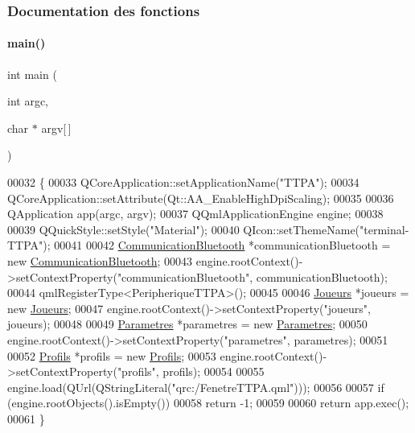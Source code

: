 \subsubsection{Documentation des fonctions}
\mbox{\label{terminal-_t_t_p_a_2main_8cpp_a0ddf1224851353fc92bfbff6f499fa97}} 
\paragraph{\texorpdfstring{main()}{main()}}
{\footnotesize\ttfamily int main (\begin{DoxyParamCaption}\item[{int}]{argc,  }\item[{char $\ast$}]{argv\mbox{[}$\,$\mbox{]} }\end{DoxyParamCaption})}


\begin{DoxyCode}
00032 \{
00033     QCoreApplication::setApplicationName(\textcolor{stringliteral}{"TTPA"});
00034     QCoreApplication::setAttribute(Qt::AA\_EnableHighDpiScaling);
00035 
00036     QApplication app(argc, argv);
00037     QQmlApplicationEngine engine;
00038 
00039     QQuickStyle::setStyle(\textcolor{stringliteral}{"Material"});
00040     QIcon::setThemeName(\textcolor{stringliteral}{"terminal-TTPA"});
00041 
00042     \hyperlink{class_communication_bluetooth}{CommunicationBluetooth} *communicationBluetooth = \textcolor{keyword}{new} 
      \hyperlink{class_communication_bluetooth}{CommunicationBluetooth};
00043     engine.rootContext()->setContextProperty(\textcolor{stringliteral}{"communicationBluetooth"}, communicationBluetooth);
00044     qmlRegisterType<PeripheriqueTTPA>();
00045 
00046     \hyperlink{class_joueurs}{Joueurs} *joueurs = \textcolor{keyword}{new} \hyperlink{class_joueurs}{Joueurs};
00047     engine.rootContext()->setContextProperty(\textcolor{stringliteral}{"joueurs"}, joueurs);
00048 
00049     \hyperlink{class_parametres}{Parametres} *parametres = \textcolor{keyword}{new} \hyperlink{class_parametres}{Parametres};
00050     engine.rootContext()->setContextProperty(\textcolor{stringliteral}{"parametres"}, parametres);
00051 
00052     \hyperlink{class_profils}{Profils} *profils = \textcolor{keyword}{new} \hyperlink{class_profils}{Profils};
00053     engine.rootContext()->setContextProperty(\textcolor{stringliteral}{"profils"}, profils);
00054 
00055     engine.load(QUrl(QStringLiteral(\textcolor{stringliteral}{"qrc:/FenetreTTPA.qml"})));
00056 
00057     \textcolor{keywordflow}{if} (engine.rootObjects().isEmpty())
00058         \textcolor{keywordflow}{return} -1;
00059 
00060     \textcolor{keywordflow}{return} app.exec();
00061 \}
\end{DoxyCode}
